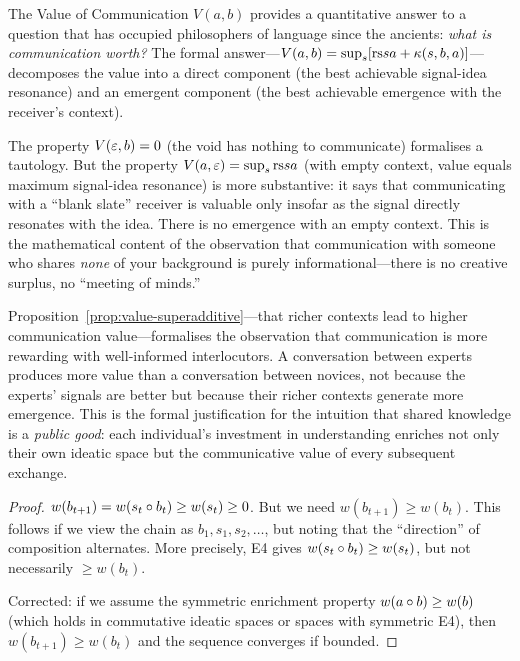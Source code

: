 \begin{interpretation}
\label{interp:ch14:value_communication_philosophy}
The Value of Communication $V(a, b)$ provides a quantitative answer to a
question that has occupied philosophers of language since the ancients:
\emph{what is communication worth?}  The formal answer---$V(a, b) =
\sup_s [\mathrm{rs}{s}{a} + \kappa(s, b, a)]$---decomposes the value into a
direct component (the best achievable signal-idea resonance) and an
emergent component (the best achievable emergence with the receiver's
context).

The property $V(\varepsilon, b) = 0$ (the void has nothing to communicate)
formalises a tautology.  But the property $V(a, \varepsilon) = \sup_s \mathrm{rs}{s}{a}$
(with empty context, value equals maximum signal-idea resonance) is more
substantive: it says that communicating with a ``blank slate'' receiver is
valuable only insofar as the signal directly resonates with the idea.  There
is no emergence with an empty context.  This is the mathematical content of
the observation that communication with someone who shares \emph{none} of
your background is purely informational---there is no creative surplus, no
``meeting of minds.''

Proposition~\ref{prop:value-superadditive}---that richer contexts lead to
higher communication value---formalises the observation that communication
is more rewarding with well-informed interlocutors.  A conversation between
experts produces more value than a conversation between novices, not because
the experts' signals are better but because their richer contexts generate
more emergence.  This is the formal justification for the intuition that
shared knowledge is a \emph{public good}: each individual's investment in
understanding enriches not only their own ideatic space but the
communicative value of every subsequent exchange.
\end{interpretation}



\begin{proof}
$w(b_{t+1}) = w(s_t \circ b_t) \geq w(s_t) \geq 0$.  But we need
$w(b_{t+1}) \geq w(b_t)$.  This follows if we view the chain as
$b_1, s_1, s_2, \ldots$, but noting that the ``direction'' of composition
alternates.  More precisely, E4 gives $w(s_t \circ b_t) \geq w(s_t)$,
but not necessarily $\geq w(b_t)$.

Corrected: if we assume the symmetric enrichment property
$w(a \circ b) \geq w(b)$ (which holds in commutative ideatic spaces or
spaces with symmetric E4), then $w(b_{t+1}) \geq w(b_t)$ and the sequence
converges if bounded.
\end{proof}

